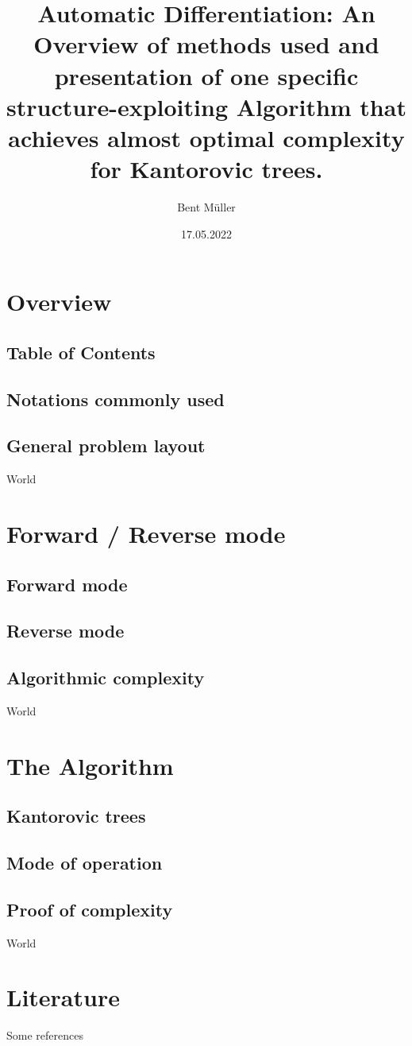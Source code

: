\documentclass[compress]{beamer}
\title{
	Automatic Differentiation:
	An Overview of methods used and presentation of one
	specific structure-exploiting Algorithm that achieves
	almost optimal complexity for Kantorovic trees.
}
\author{Bent Müller}
\institute{Universität Hamburg}
\date{17.05.2022}
\begin{document}
\begin{frame}
	\titlepage
\end{frame}

\section{Overview}
\subsection{Table of Contents}
\subsection{Notations commonly used}
\subsection{General problem layout}
\begin{frame}
	\tableofcontents
\end{frame}

\begin{frame}
	World
\end{frame}

\section{Forward / Reverse mode}
\subsection{Forward mode}
\subsection{Reverse mode}
\subsection{Algorithmic complexity}
\begin{frame}
	World
\end{frame}

\section{The Algorithm}
\subsection{Kantorovic trees}
\subsection{Mode of operation}
\subsection{Proof of complexity}

\begin{frame}
	World
\end{frame}

\section{Literature}
\begin{frame}
	Some references
\end{frame}
\end{document}
